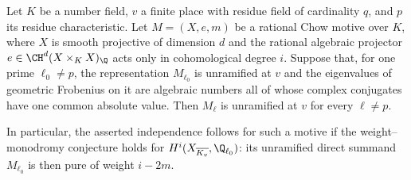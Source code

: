 \begin{proposition}
\label{c:chow-unramified-purity-reduction}
Let $K$ be a number field, $v$ a finite place with residue field of
cardinality $q$, and $p$ its residue characteristic.  Let
$M=(X,e,m)$ be a rational Chow motive over $K$, where $X$ is smooth
projective of dimension $d$ and the rational algebraic projector
$e\in\CH^d(X\times_KX)_{\Q}$ acts only in cohomological degree $i$.
Suppose that, for one prime $\ell_0\ne p$, the representation
$M_{\ell_0}$ is unramified at $v$ and the eigenvalues of geometric
Frobenius on it are algebraic numbers all of whose complex conjugates
have one common absolute value.  Then $M_\ell$ is unramified at $v$
for every $\ell\ne p$.

In particular, the asserted independence follows for such a motive if
the weight--monodromy conjecture holds for
$H^i(X_{\overline{K_v}},\Q_{\ell_0})$: its unramified direct summand
$M_{\ell_0}$ is then pure of weight $i-2m$.
\end{proposition}
